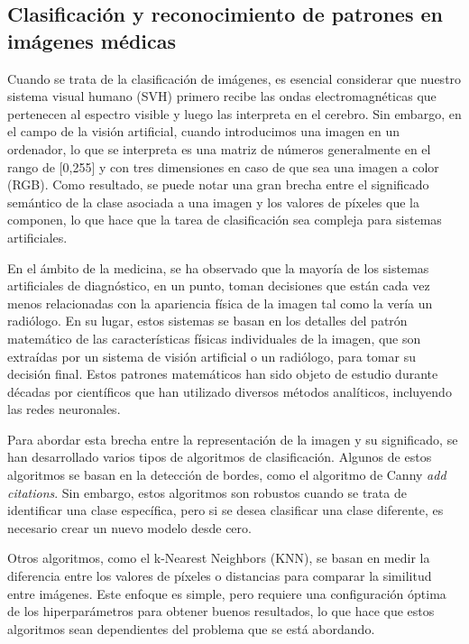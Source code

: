 \subsection{Clasificación y reconocimiento de patrones en imágenes médicas}  

Cuando se trata de la clasificación de imágenes, es esencial considerar que nuestro sistema visual humano (SVH) primero recibe las ondas electromagnéticas que pertenecen al espectro visible y luego las interpreta en el cerebro. Sin embargo, en el campo de la visión artificial, cuando introducimos una imagen en un ordenador, lo que se interpreta es una matriz de números generalmente en el rango de [0,255] y con tres dimensiones en caso de que sea una imagen a color (RGB). Como resultado, se puede notar una gran brecha entre el significado semántico de la clase asociada a una imagen y los valores de píxeles que la componen, lo que hace que la tarea de clasificación sea compleja para sistemas artificiales. 

En el ámbito de la medicina, se ha observado que la mayoría de los sistemas artificiales de diagnóstico, en un punto, toman decisiones que están cada vez menos relacionadas con la apariencia física de la imagen tal como la vería un radiólogo. En su lugar, estos sistemas se basan en los detalles del patrón matemático de las características físicas individuales de la imagen, que son extraídas por un sistema de visión artificial o un radiólogo, para tomar su decisión final. Estos patrones matemáticos han sido objeto de estudio durante décadas por científicos que han utilizado diversos métodos analíticos, incluyendo las redes neuronales. 

Para abordar esta brecha entre la representación de la imagen y su significado, se han desarrollado varios tipos de algoritmos de clasificación. Algunos de estos algoritmos se basan en la detección de bordes, como el algoritmo de Canny \textit{add citations}. 
Sin embargo, estos algoritmos son robustos cuando se trata de identificar una clase específica, pero si se desea clasificar una clase diferente, es necesario crear un nuevo modelo desde cero.

Otros algoritmos, como el k-Nearest Neighbors (KNN), se basan en medir la diferencia entre los valores de píxeles o distancias para comparar la similitud entre imágenes. Este enfoque es simple, pero requiere una configuración óptima de los hiperparámetros para obtener buenos resultados, lo que hace que estos algoritmos sean dependientes del problema que se está abordando.


